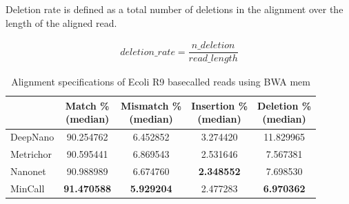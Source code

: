 \documentclass[runningheads,a4paper]{llncs}
\begin{document}
Deletion rate is defined as a total number of deletions in the alignment over the length of the aligned read.

\begin{equation}
\begin{gathered}
deletion\_rate = \dfrac{n\_deletion}{read\_length}
\end{gathered}
\end{equation}


\begin{table}[]
	\caption{Alignment specifications of Ecoli R9 basecalled reads using BWA mem}
	\label{tbl:ecoli_rates_bwa}
	\centering
	\begin{tabular}{lcccc}
		\toprule
		{} &  \thead{Match \% \\(median)} &  \thead{Mismatch \% \\(median)} &  \thead{Insertion \% \\(median)} &  \thead{Deletion \% \\(median)} \\
		\midrule
		DeepNano   &                  90.254762 &                      6.452852 &                       3.274420 &                     11.829965 \\
		Metrichor  &                  90.595441 &                      6.869543 &                       2.531646 &                      7.567381 \\
		Nanonet    &                  90.988989 &                      6.674760 &                     \textbf{  2.348552} &                      7.698530 \\
		MinCall    &                 \textbf{ 91.470588} &                      \textbf{5.929204 }&                       2.477283 &                     \textbf{ 6.970362} \\
		\bottomrule
	\end{tabular}

\end{table}
\end{document}
